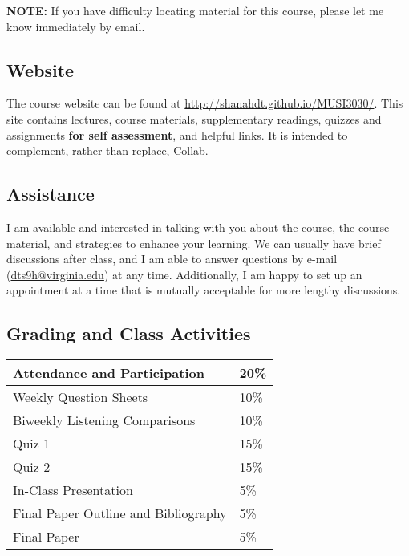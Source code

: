 \documentclass[letterpaper,10pt,english]{sphinxmanual}
\begin{document}
\textbf{NOTE:} If you have difficulty locating material for this course, please let me know immediately by email.


\subsection{Website}
\label{syllabus:website}
The course website can be found at
\href{http://shanahdt.github.io/MUSI3030/}{http://shanahdt.github.io/MUSI3030/}. This site contains lectures,
course materials, supplementary readings, quizzes and
assignments \textbf{for self assessment}, and helpful links.
It is intended to complement, rather than replace, Collab.


\subsection{Assistance}
\label{syllabus:assistance}
I am available and interested in talking with you about the course,
the course material, and strategies to enhance your learning.
We can usually have brief discussions after class, and I am able
to answer questions by e-mail (\href{mailto:dts9h@virginia.edu}{dts9h@virginia.edu}) at any time.
Additionally, I am happy to set up an appointment at a time that
is mutually acceptable for more lengthy discussions.


\subsection{Grading and Class Activities}
\label{syllabus:grading-and-class-activities}
\begin{tabulary}{\linewidth}{|L|L|}
\hline

Attendance and Participation
 & 
20\%
\\\hline

Weekly Question Sheets
 & 
10\%
\\\hline

Biweekly Listening Comparisons
 & 
10\%
\\\hline

Quiz 1
 & 
15\%
\\\hline

Quiz 2
 & 
15\%
\\\hline

In-Class Presentation
 & 
5\%
\\\hline

Final Paper Outline and Bibliography
 & 
5\%
\\\hline

Final Paper
 & 
5\%
\\\hline
\end{tabulary}
\end{document}
